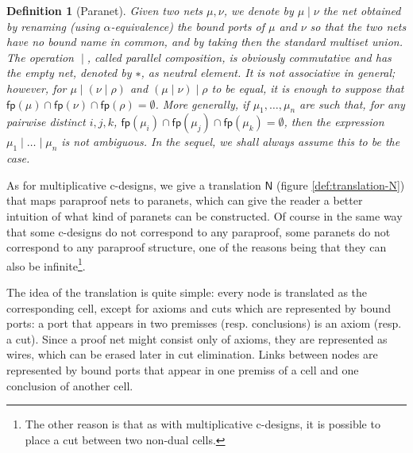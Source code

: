 \documentclass[12pt]{report}
\newtheorem{definition}{Definition}
\begin{document}
\begin{definition}[Paranet]
    Given two nets $μ, ν$, we denote by $μ ∣ ν$ the net obtained by renaming (using $α$-equivalence)
    the bound ports of $μ$ and $ν$ so that the two nets have no bound name in common, and by taking
    then the standard multiset union. The operation $∣$, called \emph{parallel composition}, is
    obviously commutative and has the empty net, denoted by $∗$, as neutral element. It is not
    associative in general; however, for $μ ∣ (ν ∣ ρ)$ and $(μ ∣ ν) ∣ ρ$ to be equal, it is enough
    to suppose that $\mathsf{fp}(μ) ∩ \mathsf{fp}(ν) ∩ \mathsf{fp}(ρ) = ∅$. More generally, if $μ_1,
    \ldots, μ_n$ are such that, for any pairwise distinct $i, j, k$, $\mathsf{fp}(μ_i) ∩
    \mathsf{fp}(μ_j) ∩ \mathsf{fp}(μ_k) = ∅$, then the expression $μ_1 ∣ \ldots ∣ μ_n$ is not
    ambiguous. In the sequel, we shall always assume this to be the case.
\end{definition}

\newpage
As for multiplicative c-designs, we give a translation $\mathsf{N}$ (figure \ref{def:translation-N})
that maps paraproof nets to paranets, which can give the reader a better intuition of what kind of
paranets can be constructed. Of course in the same way that some c-designs do not correspond to any
paraproof, some paranets do not correspond to any paraproof structure, one of the reasons being that
they can also be infinite\footnote{The other reason is that as with multiplicative c-designs, it is
possible to place a cut between two non-dual cells.}.

The idea of the translation is quite simple: every node is translated as the corresponding cell,
except for axioms and cuts which are represented by bound ports: a port that appears in two
premisses (resp. conclusions) is an axiom (resp. a cut). Since a proof net might consist only of
axioms, they are represented as wires, which can be erased later in cut elimination. Links between
nodes are represented by bound ports that appear in one premiss of a cell and one conclusion of
another cell.
\end{document}
